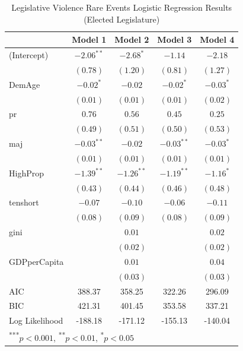 \documentclass[a4paper]{article}\usepackage{graphicx, color}
\begin{document}
\begin{table}
\caption{Legislative Violence Rare Events Logistic Regression Results (Elected Legislature)}
\label{outputTable.dem}
\begin{center}

\begin{tabular}{l c c c c }
\hline
               & Model 1 & Model 2 & Model 3 & Model 4 \\
\hline
(Intercept)    & $-2.06^{**}$ & $-2.68^{*}$  & $-1.14$      & $-2.18$     \\
               & $(0.78)$     & $(1.20)$     & $(0.81)$     & $(1.27)$    \\
DemAge         & $-0.02^{*}$  & $-0.02$      & $-0.02^{*}$  & $-0.03^{*}$ \\
               & $(0.01)$     & $(0.01)$     & $(0.01)$     & $(0.02)$    \\
pr             & $0.76$       & $0.56$       & $0.45$       & $0.25$      \\
               & $(0.49)$     & $(0.51)$     & $(0.50)$     & $(0.53)$    \\
maj            & $-0.03^{**}$ & $-0.02$      & $-0.03^{**}$ & $-0.03^{*}$ \\
               & $(0.01)$     & $(0.01)$     & $(0.01)$     & $(0.01)$    \\
HighProp       & $-1.39^{**}$ & $-1.26^{**}$ & $-1.19^{**}$ & $-1.16^{*}$ \\
               & $(0.43)$     & $(0.44)$     & $(0.46)$     & $(0.48)$    \\
tenshort       & $-0.07$      & $-0.10$      & $-0.06$      & $-0.11$     \\
               & $(0.08)$     & $(0.09)$     & $(0.08)$     & $(0.09)$    \\
gini           &              & $0.01$       &              & $0.02$      \\
               &              & $(0.02)$     &              & $(0.02)$    \\
GDPperCapita   &              & $0.01$       &              & $0.04$      \\
               &              & $(0.03)$     &              & $(0.03)$    \\
\hline
AIC            & 388.37       & 358.25       & 322.26       & 296.09      \\
BIC            & 421.31       & 401.45       & 353.58       & 337.21      \\
Log Likelihood & -188.18      & -171.12      & -155.13      & -140.04     \\
\hline
\multicolumn{5}{l}{\scriptsize{\textsuperscript{***}$p<0.001$, 
  \textsuperscript{**}$p<0.01$, 
  \textsuperscript{*}$p<0.05$}}
\end{tabular}



\end{center}
\end{table}
\end{document}
